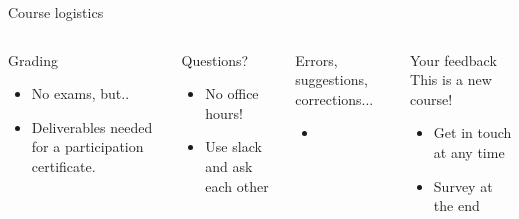 \begin{frame}{Course logistics}
    
    \begin{columns}
   
        \begin{block}{Grading}
            \begin{itemize}
                \item No exams, but..
                \item Deliverables needed for a participation certificate.
            \end{itemize}
        \end{block}

        \begin{block}{Questions?}
            \begin{itemize}
                \item No office hours!
                \item Use slack and ask each other
            \end{itemize}
        \end{block}

    
        \begin{block}{Errors, suggestions, corrections...}
            \begin{itemize}
                \item  {}
            \end{itemize}
        \end{block}

        \begin{block}{Your feedback}
        This is a new course!
            \begin{itemize}
                \item Get in touch at any time
                \item Survey at the end
            \end{itemize}
        \end{block}

        \end{columns}
    
\end{frame}
